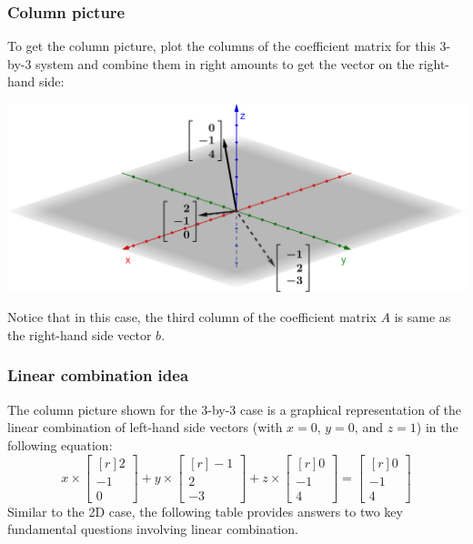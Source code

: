 \documentclass[../main.tex]{subfiles}
\begin{document}
\subsubsection{Column picture}
To get the column picture, plot the columns of the coefficient matrix for this 3-by-3 system and combine them in right amounts to get the vector on the right-hand side:

\begingroup
\centering
\includegraphics[width = \columnwidth]{../figures/fig04_3d-col-pic/geogebra-derived}
\par
\endgroup
Notice that in this case, the third column of the coefficient matrix \(A\) is same as the right-hand side vector \(b\).

\subsubsection{Linear combination idea}
The column picture shown for the 3-by-3 case is a graphical representation of the linear combination of left-hand side vectors (with \(x = 0\), \(y = 0\), and \(z = 1\)) in the following equation:
\[
    x \times
    \begin{bmatrix*}[r]
        2 \\
        -1 \\
        0
    \end{bmatrix*}
    +
    y \times
    \begin{bmatrix*}[r]
        -1 \\
        2 \\
        -3
    \end{bmatrix*}
    +
    z \times
    \begin{bmatrix*}[r]
        0 \\
        -1 \\
        4
    \end{bmatrix*}
    =
    \begin{bmatrix*}[r]
        0 \\
        -1 \\
        4
    \end{bmatrix*}
\]
Similar to the 2D case, the following table provides answers to two key fundamental questions involving linear combination.
\end{document}
